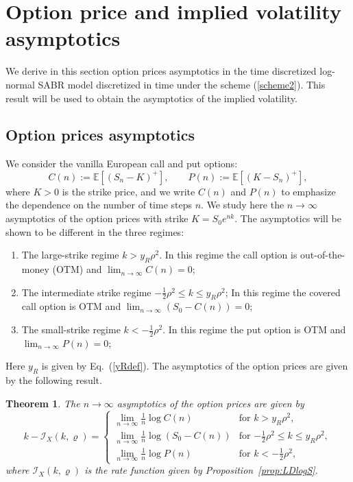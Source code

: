 \documentclass[11pt]{article}
\numberwithin{equation}{section}
\theoremstyle{plain}
\newtheorem{theorem}{Theorem}
\begin{document}

\section{Option price and implied volatility asymptotics}
\label{sec:5}

We derive in this section option prices asymptotics in the time discretized
log-normal SABR model discretized in time under the scheme (\ref{scheme2}).
This result will be used to obtain the asymptotics of the implied volatility.

\subsection{Option prices asymptotics}
\label{sec:4.1}

We consider the vanilla European call and put options:
\begin{equation}
C(n):=\mathbb{E}\left[\left(S_{n}-K\right)^{+}\right],
\qquad
P(n):=\mathbb{E}\left[\left(K-S_{n}\right)^{+}\right],
\end{equation}
where $K>0$ is the strike price, and we write $C(n)$ and $P(n)$ to emphasize
the dependence on the number of time steps $n$. We study here the $n\to
\infty$ asymptotics of the option prices with strike $K = S_0 e^{nk}$.
The asymptotics will be shown to be different in the three regimes:
\begin{enumerate}
\item The large-strike regime $k> y_R \rho^2$. In  this regime the
call option is out-of-the-money (OTM) and $\lim_{n\to \infty} C(n)=0$;
\item The intermediate strike regime $- \frac12 \rho^2 \leq k\leq y_R\rho^2$;
In  this regime the
covered call option is OTM and $\lim_{n\to \infty} (S_0-C(n))=0$;
\item The small-strike regime $k < -\frac12\rho^2$.
In  this regime the
put option is OTM and $\lim_{n\to \infty} P(n)=0$;
\end{enumerate}
Here $y_R$ is given by Eq.~(\ref{yRdef}).
The asymptotics of the option prices are given by the following result.

\begin{theorem}\label{Thm:1} 
The $n\to \infty$ asymptotics of the option prices are given by
\begin{equation}
k - \mathcal{I}_X(k,\varrho)
=\begin{cases}
\lim_{n\rightarrow\infty}\frac{1}{n}\log C(n) &
\text{for $k> y_R \rho^{2}$},
\\
\lim_{n\rightarrow\infty}\frac{1}{n}\log(S_{0}-C(n)) &
\text{for $-\frac{1}{2}\rho^{2}\leq k\leq y_R \rho^{2}$},
\\
\lim_{n\rightarrow\infty}\frac{1}{n}\log P(n) &
\text{for $k<-\frac{1}{2}\rho^{2}$},
\end{cases}
\end{equation}
where $\mathcal{I}_X(k, \varrho)$ is the rate function given by 
Proposition~\ref{prop:LDlogS}. 
\end{theorem}
\end{document}
